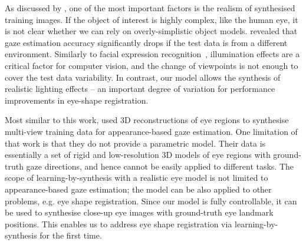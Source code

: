 As discussed by \citet{kaneva2011evaluation}, one of the most important factors is the realism of synthesised training images.
If the object of interest is highly complex, like the human eye, it is not clear whether we can rely on overly-simplistic object models.
\citet{zhang15_cvpr} revealed that gaze estimation accuracy significantly drops if the test data is from a different environment.
Similarly to facial expression recognition~\cite{stratou2011effect}, illumination effects are a critical factor for computer vision, and the change of viewpoints is not enough to cover the test data variability.
In contrast, our model allows the synthesis of realistic lighting effects -- an important degree of variation for performance improvements in eye-shape registration.

Most similar to this work, \citet{sugano2014learning} used 3D reconstructions of eye regions to synthesise multi-view training data for appearance-based gaze estimation.
One limitation of that work is that they do not provide a parametric model.
Their data is essentially a set of rigid and low-resolution 3D models of eye regions with ground-truth gaze directions, and hence cannot be easily applied to different tasks.
The scope of learning-by-synthesis with a realistic eye model is not limited to appearance-based gaze estimation; the model can be also applied to other problems, e.g. eye shape registration.
Since our model is fully controllable, it can be used to synthesise close-up eye images with ground-truth eye landmark positions.
This enables us to address eye shape registration via learning-by-synthesis for the first time.


